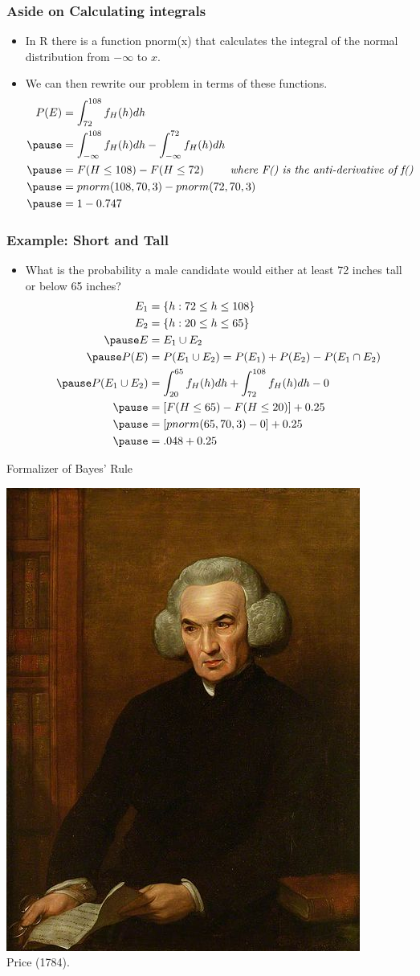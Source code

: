 \documentclass[aspectratio=169, handout]{beamer}
\numberwithin{equation}{section}
\begin{document}
\begin{frame}
\frametitle{Aside on Calculating integrals}
\begin{itemize}
\item In R there is a function pnorm(x) that calculates the integral of the normal distribution from $-\infty$ to $x$.\pause 
\item We can then rewrite our problem in terms of these functions.
\begin{align*}
P(E)&=\int_{72}^{108} f_H(h) dh\\\pause
&=\int_{-\infty}^{108} f_H(h) dh-\int_{-\infty}^{72} f_H(h) dh\\\pause
&= F(H \leq 108)-F(H \leq 72) \ \quad \quad \textit{where F() is the anti-derivative of f()}\\\pause
&=pnorm(108, 70, 3) - pnorm(72, 70, 3)\\\pause
&=1-0.747
\end{align*}
\end{itemize}
\end{frame}


\begin{frame}
\frametitle{Example: Short and Tall}
\begin{itemize}
\item What is the probability a male candidate would either at least 72 inches tall or below 65 inches?
\begin{align*}
E_1 &= \{h: 72 \leq h \leq 108\}\\
E_2 &= \{h: 20 \leq h \leq 65\}\\\pause
E&= E_1\cup E_2\\\pause
P(E)&= P(E_1\cup E_2)=P(E_1)+P(E_2)-P(E_1\cap E_2)\\\pause 
P(E_1\cup E_2)&=\int_{20}^{65} f_H(h) dh+\int_{72}^{108} f_H(h) dh-0\\\pause
&= [F(H \leq 65)-F(H \leq 20)]+0.25\\\pause
&=[pnorm(65, 70, 3)-0] +0.25\\\pause
&=.048+0.25
\end{align*}
\end{itemize}
\end{frame}

\begin{frame}{Formalizer of Bayes' Rule}
\begin{center}
\includegraphics[width=1.8 in]{images/Richard_Price_West.jpeg}\\
Price (1784).
\end{center}
\end{frame}
\end{document}
